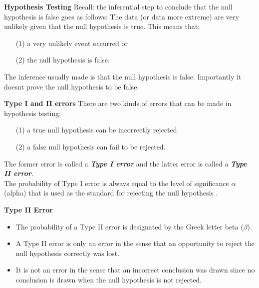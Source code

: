 
\noindent \textbf{Hypothesis Testing}
\large
Recall: the inferential step to conclude that the null hypothesis is false goes as follows: The data (or data more extreme) are very unlikely given that the null hypothesis is true.
\bigskip
This means that:
\begin{itemize}\item [(1)] a very unlikely event occurred or
\item[(2)] the null hypothesis is false. \end{itemize}
The inference usually made is that the null hypothesis is false. Importantly it doesnt prove the null hypothesis to be false.


\noindent \textbf{Type I and II errors}
\large
There are two kinds of errors that can be made in hypothesis testing:
\begin{itemize}
\item[(1)] a true null hypothesis can be incorrectly rejected
\item[(2)] a false null hypothesis can fail to be rejected.
\end{itemize}
The former error is called a \textbf{\emph{Type I error}} and the latter error is called a \textbf{\emph{Type II error}}. \\ \bigskip
The probability of Type I error is always equal to the level of significance $\alpha$ (alpha) that is used as the standard for rejecting the null hypothesis .


\noindent \textbf{Type II Error}
\begin{itemize}

\item The probability of a Type II error is designated by the Greek letter beta ($\beta$).
\item A Type II error is only an error in the sense that an opportunity to reject the null hypothesis correctly was lost.
\item It is not an error in the sense that an incorrect conclusion was drawn since no conclusion is drawn when the null hypothesis is not rejected.
\end{itemize}


